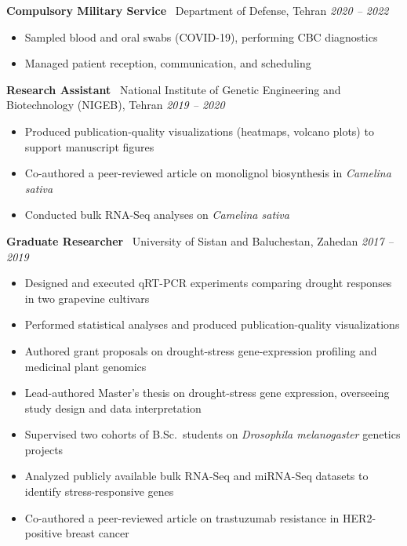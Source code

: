 \documentclass[10pt, a4paper]{article}
\newcommand{\cventry}[4]{%
  \noindent
  \textbf{#2} \textbar\ #3, #4 \hfill \textit{#1}\par\vspace{0pt}
}
\begin{document}
\vspace{1pt}

\cventry{2020 -- 2022}
  {Compulsory Military Service}
  {Department of Defense}
  {Tehran}
\begin{itemize}
  \item Sampled blood and oral swabs (COVID-19), performing CBC diagnostics
  \item Managed patient reception, communication, and scheduling
\end{itemize}

\vspace{1pt}

\cventry{2019 -- 2020}
  {Research Assistant}
  {National Institute of Genetic Engineering and Biotechnology (NIGEB)}
  {Tehran}
\begin{itemize}
  \item Produced publication-quality visualizations (heatmaps, volcano plots) to support manuscript figures
  \item Co-authored a peer-reviewed article on monolignol biosynthesis in \textit{Camelina sativa}
  \item Conducted bulk RNA-Seq analyses on \textit{Camelina sativa}
\end{itemize}

\vspace{1pt}

\cventry{2017 -- 2019}
  {Graduate Researcher}
  {University of Sistan and Baluchestan}
  {Zahedan}
\begin{itemize}
  \item Designed and executed qRT-PCR experiments comparing drought responses in two grapevine cultivars
  \item Performed statistical analyses and produced publication-quality visualizations
  \item Authored grant proposals on drought-stress gene-expression profiling and medicinal plant genomics
  \item Lead-authored Master's thesis on drought-stress gene expression, overseeing study design and
        data interpretation
  \item Supervised two cohorts of B.Sc.\ students on \textit{Drosophila melanogaster} genetics projects
  \item Analyzed publicly available bulk RNA-Seq and miRNA-Seq datasets to identify stress-responsive genes
  \item Co-authored a peer-reviewed article on trastuzumab resistance in HER2-positive breast cancer
\end{itemize}
\end{document}
